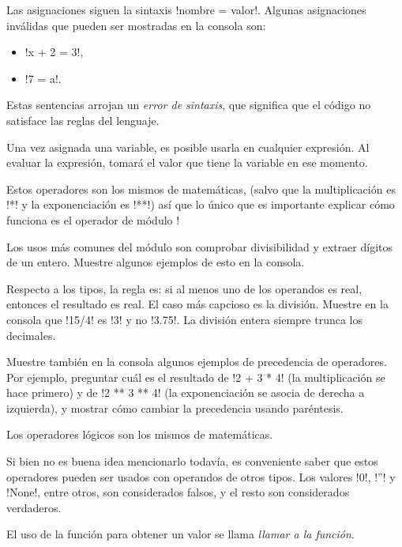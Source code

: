 \documentclass[10pt]{article}
\begin{document}
  Las asignaciones siguen la sintaxis \li!nombre = valor!.
  Algunas asignaciones inválidas
  que pueden ser mostradas en la consola son:
  \begin{itemize}
    \item \li!x + 2 = 3!,
    \item \li!7 = a!.
  \end{itemize}
  Estas sentencias arrojan un \emph{error de sintaxis},
  que significa que el código no satisface las reglas del lenguaje.

  Una vez asignada una variable,
  es posible usarla en cualquier expresión.
  Al evaluar la expresión,
  tomará el valor que tiene la variable en ese momento.

  
  Estos operadores son los mismos de matemáticas,
  (salvo que la multiplicación es \li!*!
  y la exponenciación es \li!**!)
  así que lo único que es importante explicar cómo funciona
  es el operador de módulo \li!%

  Los usos más comunes del módulo son
  comprobar divisibilidad y extraer dígitos de un entero.
  Muestre algunos ejemplos de esto en la consola.

  Respecto a los tipos, la regla es:
  si al menos uno de los operandos es real,
  entonces el resultado es real.
  El caso más capcioso es la división.
  Muestre en la consola que \li!15/4! es \li!3! y no \li!3.75!.
  La división entera siempre trunca los decimales.

  Muestre también en la consola
  algunos ejemplos de precedencia de operadores.
  Por ejemplo,
  preguntar cuál es el resultado de \li!2 + 3 * 4!
  (la multiplicación se hace primero)
  y de \li!2 ** 3 ** 4!
  (la exponenciación se asocia de derecha a izquierda),
  y mostrar cómo cambiar la precedencia usando paréntesis.
  

  Los operadores lógicos son los mismos de matemáticas.

  Si bien no es buena idea mencionarlo todavía,
  es conveniente saber que estos operadores pueden ser usados
  con operandos de otros tipos.
  Los valores \li!0!, \li!''! y \li!None!, entre otros,
  son considerados falsos,
  y el resto son considerados verdaderos.


  El uso de la función para obtener un valor
  se llama \emph{llamar a la función}.
\end{document}
